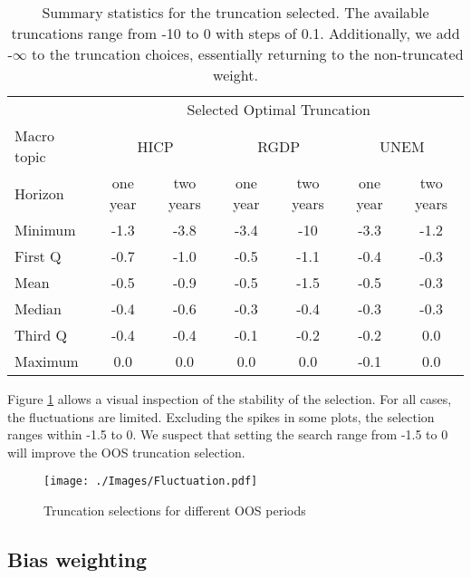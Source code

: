\documentclass[11pt]{article}
\begin{document}
	\begin{table}[!h]
		\centering
		\caption{Summary statistics for the truncation selected. The available truncations range from -10 to 0 with steps of 0.1. Additionally, we add -$\infty$ to the truncation choices, essentially returning to the non-truncated weight.}
		\label{tab: truncation summary statistics}
		\begin{tabular}{lcccccc}%
			\hline
			&\multicolumn{6}{c}{Selected Optimal Truncation}\\
			\cmidrule(lr){2-7}
			Macro topic & \multicolumn{2}{c}{HICP} & \multicolumn{2}{c}{RGDP} & \multicolumn{2}{c}{UNEM} \\
			\cmidrule(lr){2-3} \cmidrule(lr){4-5}\cmidrule(lr){6-7}
			Horizon     & one year & two years & one year & two years & one year & two years \\ 
			\hline
			Minimum     & -1.3        & -3.8        & -3.4        & -10         & -3.3        & -1.2        \\
			First Q     & -0.7        & -1.0        & -0.5        & -1.1        & -0.4        & -0.3        \\
			Mean        & -0.5        & -0.9        & -0.5        & -1.5        & -0.5        & -0.3        \\
			Median      & -0.4        & -0.6        & -0.3        & -0.4        & -0.3        & -0.3        \\
			Third Q     & -0.4        & -0.4        & -0.1        & -0.2        & -0.2        & 0.0         \\
			Maximum     & 0.0         & 0.0         & 0.0         & 0.0         & -0.1         & 0.0         \\ 
			\hline
		\end{tabular}
	\end{table}
	
	Figure \ref{fig: fluctuation} allows a visual inspection of the stability of the selection. For all cases, the fluctuations are limited. Excluding the spikes in some plots, the selection ranges within -1.5 to 0. We suspect that setting the search range from -1.5 to 0 will improve the OOS truncation selection. 
	
	\begin{figure}[!h]
		\centering
		\texttt{[image: ./Images/Fluctuation.pdf]}
		\caption{Truncation selections for different OOS periods}\label{fig: fluctuation}
	\end{figure}
	
	\subsection{Bias weighting}\label{bias-weighting}
	
\end{document}
